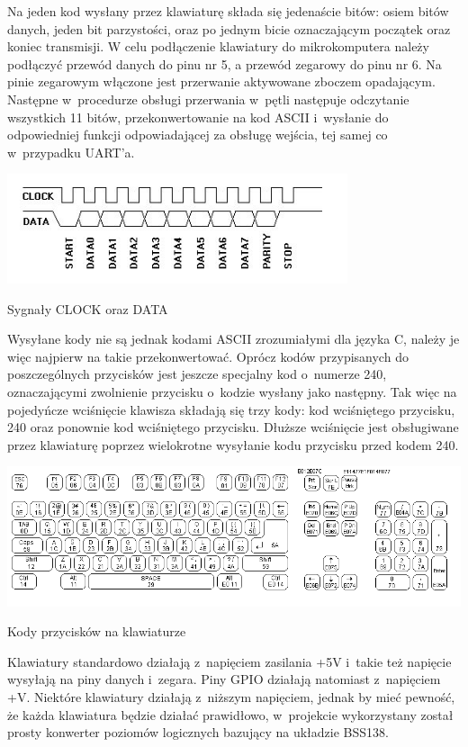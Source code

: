 \documentclass[shortabstract]{iithesis}
\begin{document}
Na jeden kod wysłany przez klawiaturę składa się jedenaście bitów: osiem bitów danych, jeden bit parzystości, oraz po jednym bicie oznaczającym początek oraz koniec transmisji. W celu podłączenie klawiatury do mikrokomputera należy podłączyć przewód danych do pinu nr 5, a przewód zegarowy do pinu nr 6. Na pinie zegarowym włączone jest przerwanie aktywowane zboczem opadającym. Następne w~procedurze obsługi przerwania w~pętli następuje odczytanie wszystkich 11 bitów, przekonwertowanie na kod ASCII i~wysłanie do odpowiedniej funkcji odpowiadającej za obsługę wejścia, tej samej co w~przypadku UART'a.

\begingroup
\centering
\includegraphics[width=0.75\textwidth]{signals.png}
\captionsetup{type=figure}
\caption{Sygnały CLOCK oraz DATA}
\endgroup

Wysyłane kody nie są jednak kodami ASCII zrozumiałymi dla języka C, należy je więc najpierw na takie przekonwertować. Oprócz kodów przypisanych do poszczególnych przycisków jest jeszcze specjalny kod o~numerze 240, oznaczającymi zwolnienie przycisku o~kodzie wysłany jako następny. Tak więc na pojedyńcze wciśnięcie klawisza składają się trzy kody: kod wciśniętego przycisku, 240 oraz ponownie kod wciśniętego przycisku. Dłuższe wciśnięcie jest obsługiwane przez klawiaturę poprzez wielokrotne wysyłanie kodu przycisku przed kodem 240.

\begingroup
\centering
\includegraphics[width=\textwidth]{scancode.png}
\captionsetup{type=figure}
\caption{Kody przycisków na klawiaturze}
\endgroup

Klawiatury standardowo działają z~napięciem zasilania +5V i~takie też napięcie wysyłają na piny danych i~zegara. Piny GPIO działają natomiast z~napięciem +V. Niektóre klawiatury działają z~niższym napięciem, jednak by mieć pewność, że każda klawiatura będzie działać prawidłowo, w~projekcie wykorzystany został prosty konwerter poziomów logicznych bazujący na układzie BSS138.
 
\end{document}
